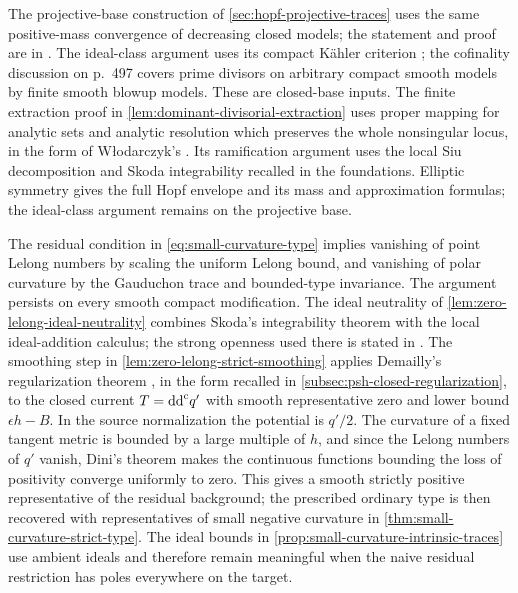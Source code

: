 \label{hist:hopf-projective-traces}
The projective-base construction of \cref{sec:hopf-projective-traces} uses the same positive-mass convergence of decreasing closed models; the statement and proof are in \cite[Proposition~3.1.12, pp.~96--97, with Lemma~2.4.4, pp.~67--71]{SGPT}. The ideal-class argument uses its compact K\"ahler criterion \cite[Proposition~3.2.1, pp.~122--123]{SGPT}; the cofinality discussion on p.~497 covers prime divisors on arbitrary compact smooth models by finite smooth blowup models. These are closed-base inputs. The finite extraction proof in \cref{lem:dominant-divisorial-extraction} uses proper mapping for analytic sets and analytic resolution which preserves the whole nonsingular locus, in the form of W{\l}odarczyk's \cite[Theorem~2.0.1(1), p.~34]{Wlo09}. Its ramification argument uses the local Siu decomposition and Skoda integrability recalled in the foundations. Elliptic symmetry gives the full Hopf envelope and its mass and approximation formulas; the ideal-class argument remains on the projective base.

The residual condition in \eqref{eq:small-curvature-type} implies vanishing
of point Lelong numbers by scaling the uniform Lelong bound, and
vanishing of polar curvature by the Gauduchon trace and bounded-type
invariance. The argument persists on every smooth compact modification.
The ideal neutrality of \cref{lem:zero-lelong-ideal-neutrality} combines
Skoda's integrability theorem \cite[Lemma~5.6]{DemAM11} with the local
ideal-addition calculus; the strong openness used there is stated in
\cite[arXiv~v2, Corollary~2.3, p.~12]{DemCohomology15}.
The smoothing step in \cref{lem:zero-lelong-strict-smoothing} applies
Demailly's regularization theorem \cite[Main Theorem~1.1]{Dem92}, in the
form recalled in \cref{subsec:psh-closed-regularization}, to the
closed current $T=\mathrm{dd}^{\mathrm{c}} q'$ with smooth representative zero and lower
bound $\epsilon h-B$. In the source normalization the potential is
$q'/2$. The curvature of a fixed tangent metric is bounded by a large
multiple of $h$, and since the Lelong numbers of $q'$ vanish, Dini's
theorem makes the continuous functions bounding the loss of positivity
converge uniformly to zero. This gives a smooth strictly positive
representative of the residual background; the prescribed ordinary type
is then recovered with representatives of small negative curvature in
\cref{thm:small-curvature-strict-type}. The ideal bounds
in \cref{prop:small-curvature-intrinsic-traces} use ambient ideals and
therefore remain meaningful when the naive residual restriction has
poles everywhere on the target.

